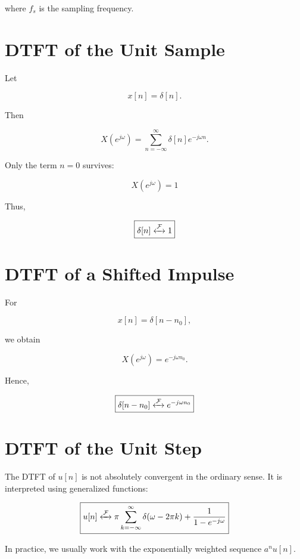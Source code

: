 where \(f_s\) is the sampling frequency.


\section{DTFT of the Unit Sample}

Let

\[
x[n]=\delta[n].
\]

Then

\[
X(e^{j\omega})=
\sum_{n=-\infty}^{\infty}
\delta[n]e^{-j\omega n}.
\]

Only the term \(n=0\) survives:

\[
\boxed{
X(e^{j\omega})=1
}
\]

Thus,

\[
\boxed{
\delta[n]\xleftrightarrow{\mathcal{F}}1
}
\]


\section{DTFT of a Shifted Impulse}

For

\[
x[n]=\delta[n-n_0],
\]

we obtain

\[
X(e^{j\omega})=
e^{-j\omega n_0}.
\]

Hence,

\[
\boxed{
\delta[n-n_0]
\xleftrightarrow{\mathcal{F}}
e^{-j\omega n_0}
}
\]


\section{DTFT of the Unit Step}

The DTFT of \(u[n]\) is not absolutely convergent in the ordinary sense. It is
interpreted using generalized functions:

\[
\boxed{
u[n]
\xleftrightarrow{\mathcal{F}}
\pi\sum_{k=-\infty}^{\infty}\delta(\omega-2\pi k)
+\frac{1}{1-e^{-j\omega}}
}
\]

In practice, we usually work with the exponentially weighted sequence
\(a^n u[n]\).


